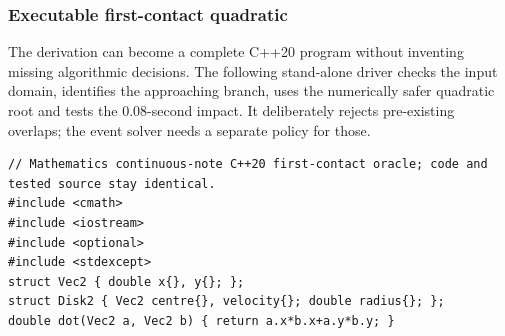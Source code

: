 \subsubsection{Executable first-contact quadratic}\label{02-foundations-ii-ch031-executable-first-contact-quadratic}

The derivation can become a complete C++20 program without inventing missing algorithmic decisions. The following stand-alone driver checks the input domain, identifies the approaching branch, uses the numerically safer quadratic root and tests the 0.08-second impact. It deliberately rejects pre-existing overlaps; the event solver needs a separate policy for those.

\begin{verbatim}
// Mathematics continuous-note C++20 first-contact oracle; code and tested source stay identical.
#include <cmath>
#include <iostream>
#include <optional>
#include <stdexcept>
struct Vec2 { double x{}, y{}; };
struct Disk2 { Vec2 centre{}, velocity{}; double radius{}; };
double dot(Vec2 a, Vec2 b) { return a.x*b.x+a.y*b.y; }


\end{verbatim}
